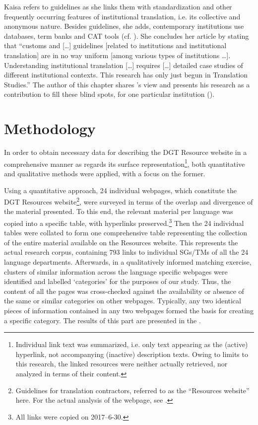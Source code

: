 \documentclass[output=paper]{langsci/langscibook}
\begin{document}
\largerpage
Kaisa \citet{Koskinen2011} refers to guidelines as she links them with standardization and other frequently occurring features of institutional translation, i.e. its collective and anonymous nature. Besides guidelines, she adds, contemporary institutions use databases, term banks and CAT tools (cf. \citealt[58]{Koskinen2011}). She concludes her article by stating that “customs and […] guidelines [related to institutions and institutional translation] are in no way uniform [among various types of institutions …]. Understanding institutional translation […] requires […] detailed case studies of different institutional contexts. This research has only just begun in Translation Studies.” \citealt[59]{Koskinen2011} The author of this chapter shares \citeauthor{Koskinen2011}’s view and presents his research as a contribution to fill these blind spots, for one particular institution (\citeauthor{DGT2008}).

\section{Methodology}\label{sec:svoboda:methodology}

In order to obtain necessary data for describing the DGT Resource website in a comprehensive manner as regards its surface representation\footnote{Individual link text was summarized, i.e. only text appearing as the (active) hyperlink, not accompanying (inactive) description texts. Owing to limits to this research, the linked resources were neither actually retrieved, nor analyzed in terms of their content.}, both quantitative and qualitative methods were applied, with a focus on the former.

Using a quantitative approach, 24 individual webpages, which constitute the DGT Resources website\footnote{Guidelines for translation contractors, referred to as the “Resources website” here. For the actual analysis of the webpage, see .}, were surveyed in terms of the overlap and divergence of the material presented. To this end, the relevant material per language was copied into a specific table, with hyperlinks preserved.\footnote{All links were copied on 2017–6-30.}  Then the 24 individual tables were collated to form one comprehensive table representing the collection of the entire material available on the Resources website. This represents the actual research corpus, containing 793 links to individual SGs/TMs of all the 24 language departments. Afterwards, in a qualitatively informed matching exercise, clusters of similar information across the language specific webpages were identified and labelled ‘categories’ for the purposes of our study. Thus, the content of all the pages was cross-checked against the availability or absence of the same or similar categories on other webpages. Typically, any two identical pieces of information contained in any two webpages formed the basis for creating a specific category. The results of this part are presented in the .
\end{document}
